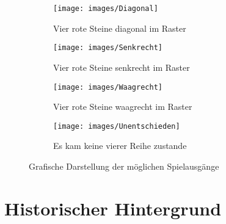\begin{figure}[H]
\begin{subfigure}{0.45\textwidth}
	\centering
	\texttt{[image: images/Diagonal]}
	\caption[Vier rote Steine diagonal]{Vier rote Steine diagonal im Raster}
	\label{fig:diagonal}
\end{subfigure}\hfill
\begin{subfigure}{0.45\textwidth}
	\centering
	\texttt{[image: images/Senkrecht]}
	\caption[Vier rote Steine in Reihe senkrecht]{Vier rote Steine senkrecht im Raster}
	\label{fig:senkrecht}
\end{subfigure}
\begin{subfigure}{0.45\textwidth}
	\centering
	\texttt{[image: images/Waagrecht]}
	\caption[Vier rote Steine in Reihe waagrecht]{Vier rote Steine waagrecht im Raster}
	\label{fig:waagrecht}
\end{subfigure}\hfill
\begin{subfigure}{0.45\textwidth}
	\centering
	\texttt{[image: images/Unentschieden]}
	\caption[Unentschieden]{Es kam keine vierer Reihe zustande}
	\label{fig:unentschiedent}
\end{subfigure}
\caption[Mögliche Spielausgänge]{Grafische Darstellung der möglichen Spielausgänge}
\end{figure}
%
\section{Historischer Hintergrund}

